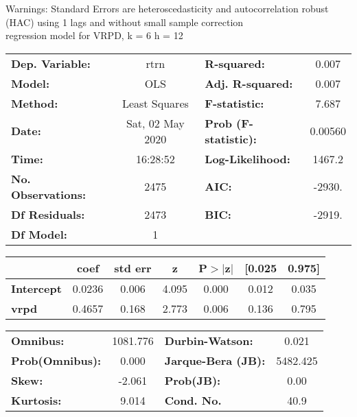 Warnings: \newline
 [1] Standard Errors are heteroscedasticity and autocorrelation robust (HAC) using 1 lags and without small sample correction\\ 

regression model for VRPD, k = 6 h = 12\begin{center}
\begin{tabular}{lclc}
\toprule
\textbf{Dep. Variable:}    &       rtrn       & \textbf{  R-squared:         } &     0.007   \\
\textbf{Model:}            &       OLS        & \textbf{  Adj. R-squared:    } &     0.007   \\
\textbf{Method:}           &  Least Squares   & \textbf{  F-statistic:       } &     7.687   \\
\textbf{Date:}             & Sat, 02 May 2020 & \textbf{  Prob (F-statistic):} &  0.00560    \\
\textbf{Time:}             &     16:28:52     & \textbf{  Log-Likelihood:    } &    1467.2   \\
\textbf{No. Observations:} &        2475      & \textbf{  AIC:               } &    -2930.   \\
\textbf{Df Residuals:}     &        2473      & \textbf{  BIC:               } &    -2919.   \\
\textbf{Df Model:}         &           1      & \textbf{                     } &             \\
\bottomrule
\end{tabular}
\begin{tabular}{lcccccc}
                   & \textbf{coef} & \textbf{std err} & \textbf{z} & \textbf{P$> |$z$|$} & \textbf{[0.025} & \textbf{0.975]}  \\
\midrule
\textbf{Intercept} &       0.0236  &        0.006     &     4.095  &         0.000        &        0.012    &        0.035     \\
\textbf{vrpd}      &       0.4657  &        0.168     &     2.773  &         0.006        &        0.136    &        0.795     \\
\bottomrule
\end{tabular}
\begin{tabular}{lclc}
\textbf{Omnibus:}       & 1081.776 & \textbf{  Durbin-Watson:     } &    0.021  \\
\textbf{Prob(Omnibus):} &   0.000  & \textbf{  Jarque-Bera (JB):  } & 5482.425  \\
\textbf{Skew:}          &  -2.061  & \textbf{  Prob(JB):          } &     0.00  \\
\textbf{Kurtosis:}      &   9.014  & \textbf{  Cond. No.          } &     40.9  \\
\bottomrule
\end{tabular}
\end{center}


